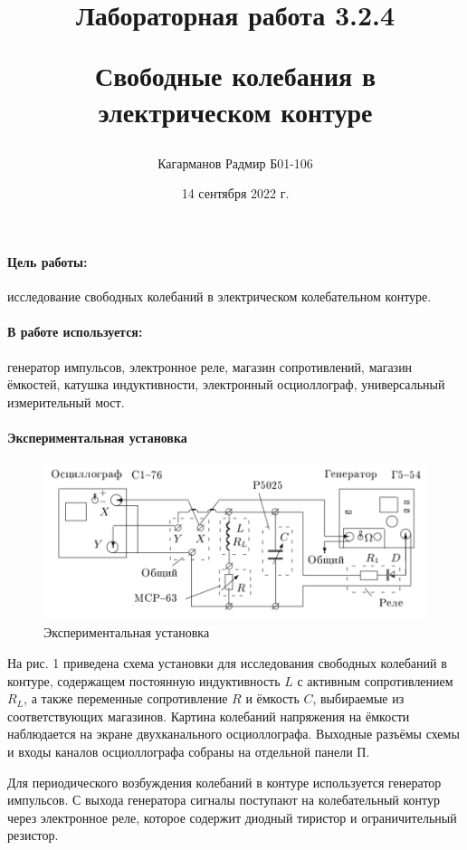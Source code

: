\documentclass[a4paper,12pt]{article}
\title{Лабораторная работа 3.2.4 

Свободные колебания в электрическом контуре}
\author{Кагарманов Радмир Б01-106}
\date{14 сентября 2022 г.}
\begin{document}
\maketitle
\thispagestyle{empty}
\newpage
\setcounter{page}{1}
\paragraph{Цель работы:} исследование свободных колебаний в электрическом колебательном контуре.
\paragraph{В работе используется:} генератор импульсов, электронное реле, магазин сопротивлений, магазин ёмкостей, катушка индуктивности, электронный осциоллограф, универсальный измерительный мост.
\paragraph{Экспериментальная установка\\}

\begin{figure}[!h]
\centering
\includegraphics[width=0.9\linewidth]{Установка.png}
\caption{Экспериментальная установка}
\label{fig:mpr}
\end{figure}

На рис. 1 приведена схема установки для исследования свободных колебаний в контуре, содержащем постоянную индуктивность $L$ с активным сопротивлением $R_{L}$, а также переменные сопротивление $R$ и ёмкость $C$, выбираемые из соответствующих магазинов. Картина колебаний напряжения на ёмкости наблюдается на экране двухканального осциоллографа. Выходные разъёмы схемы и входы каналов осциоллографа собраны на отдельной панели $\text{П}$. \par
Для периодического возбуждения колебаний в контуре используется генератор импульсов. С выхода генератора сигналы поступают на колебательный контур через электронное реле, которое содержит диодный тиристор и ограничительный резистор.
\end{document}
